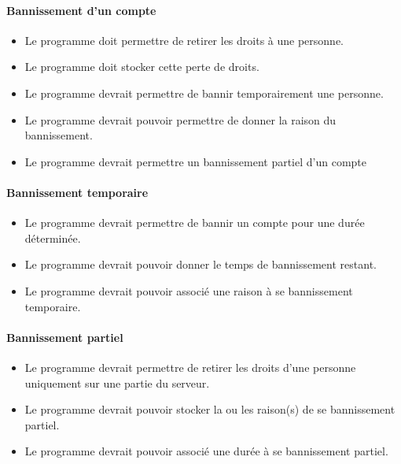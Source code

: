 \documentclass[10pt,a4paper]{report}
\begin{document}
\paragraph{Bannissement d'un compte}
	\begin{itemize}[label = $\triangleright$]
		\item Le programme doit permettre de retirer les droits à une personne.
		\item Le programme doit stocker cette perte de droits.
		\item Le programme devrait permettre de bannir temporairement une personne.
		\item Le programme devrait pouvoir permettre de donner la raison du bannissement.
		\item Le programme devrait permettre un bannissement partiel d'un compte
	\end{itemize}
	
\paragraph{Bannissement temporaire}
	\begin{itemize}[label = $\triangleright$]
		\item Le programme devrait permettre de bannir un compte pour une durée déterminée.
		\item Le programme devrait pouvoir donner le temps de bannissement restant.
		\item Le programme devrait pouvoir associé une raison à se bannissement temporaire.
	\end{itemize}
	
\paragraph{Bannissement partiel}
	\begin{itemize}[label = $\triangleright$]
		\item Le programme devrait permettre de retirer les droits d'une personne uniquement sur une partie du serveur.
		\item Le programme devrait pouvoir stocker la ou les raison(s) de se bannissement partiel.
		\item Le programme devrait pouvoir associé une durée à se bannissement partiel.
	\end{itemize}
	
\end{document}
